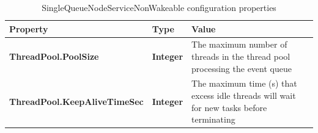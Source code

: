 \begin{table}
\scriptsize
\begin{center}
\begin{tabular}{p{6.3cm} p{0.9cm} p{7.3cm}}
	\hline
	\textbf{Property}							& \textbf{Type}						& \textbf{Value}					\\[1mm]
    \hline
	\textbf{ThreadPool.PoolSize}				& \textbf{Integer}					& The maximum number of threads in the thread pool processing the event queue					\\[1.5mm]	
	\textbf{ThreadPool.KeepAliveTimeSec}		& \textbf{Integer}					& The maximum time (s) that excess idle threads will wait for new tasks before terminating		\\[1.5mm]	
    \hline
\end{tabular}
\end{center}
\caption{SingleQueueNodeServiceNonWakeable configuration properties}
\label{tab:libSingleQueueNodeServiceNonWakeable}
\end{table}



